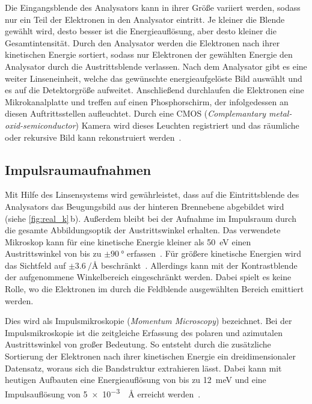         Die Eingangsblende des Analysators kann in ihrer Größe variiert werden, sodass nur ein Teil der Elektronen in den Analysator eintritt.
        Je kleiner die Blende gewählt wird, desto besser ist die Energieauflösung, aber desto kleiner die Gesamtintensität.
        Durch den Analysator werden die Elektronen nach ihrer kinetischen Energie sortiert, sodass nur Elektronen der gewählten Energie den Analysator durch die Austrittsblende verlassen.
        Nach dem Analysator gibt es eine weiter Linseneinheit, welche das gewünschte energieaufgelöste Bild auswählt und es auf die Detektorgröße aufweitet.
        Anschließend durchlaufen die Elektronen eine Mikrokanalplatte und treffen auf einen Phosphorschirm, der infolgedessen an diesen Auftrittsstellen aufleuchtet.
        Durch eine CMOS (\textit{Complemantary metal-oxid-semiconductor}) Kamera wird dieses Leuchten registriert und das räumliche oder rekursive Bild kann rekonstruiert werden~\cite{SPECS-MM}. 

        \subsection{Impulsraumaufnahmen}
            Mit Hilfe des Linsensystems wird gewährleistet, dass auf die Eintrittsblende des Analysators das Beugungsbild aus der hinteren Brennebene abgebildet wird (siehe \autoref{fig:real_k}\,b).
            Außerdem bleibt bei der Aufnahme im Impulsraum durch die gesamte Abbildungsoptik der Austrittswinkel erhalten.
            Das verwendete Mikroskop kann für eine kinetische Energie kleiner als \SI{50}{\electronvolt} einen Austrittswinkel von bis zu $\pm\SI{90}{\degree}$ erfassen~\cite{SPECS-MM}.
            Für größere kinetische Energien wird das Sichtfeld auf $\pm\SI[per-mode=reciprocal]{3.6}{\per\angstrom}$ beschränkt~\cite{SPECS-MM}.
            Allerdings kann mit der Kontrastblende der aufgenommene Winkelbereich eingeschränkt werden.
            Dabei spielt es keine Rolle, wo die Elektronen im durch die Feldblende ausgewählten Bereich emittiert werden.

            Dies wird als Impulsmikroskopie (\textit{Momentum Microscopy}) bezeichnet.
            Bei der Impulsmikroskopie ist die zeitgleiche Erfassung des polaren und azimutalen Austrittswinkel von großer Bedeutung. 
            So entsteht durch die zusätzliche Sortierung der Elektronen nach ihrer kinetischen Energie ein dreidimensionaler Datensatz, woraus sich die Bandstruktur extrahieren lässt.
            Dabei kann mit heutigen Aufbauten eine Energieauflösung von bis zu \SI{12}{\milli\electronvolt} und eine Impulsauflösung von \SI[per-mode=reciprocal]{5e-3}{\per\angstrom} erreicht werden~\cite{suga_photoelectron_2021}.

